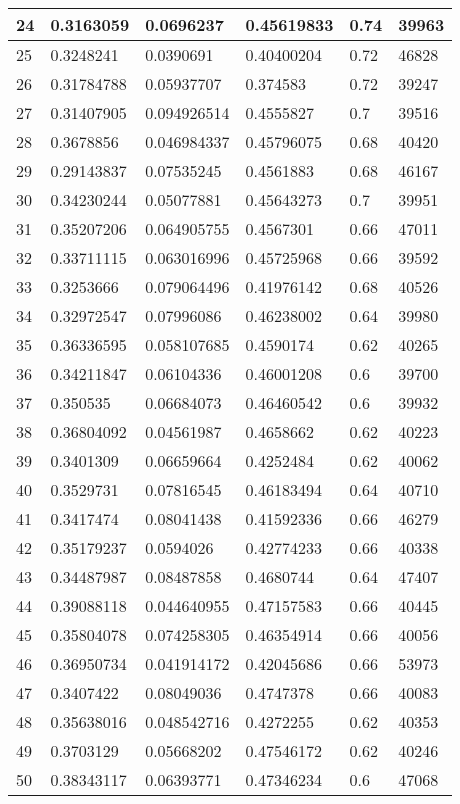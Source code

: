 \begin{longtable}{|l|l|l|l|l|l|}
24 & 0.3163059 & 0.0696237 & 0.45619833 & 0.74 & 39963 \\ \hline 
25 & 0.3248241 & 0.0390691 & 0.40400204 & 0.72 & 46828 \\ \hline 
26 & 0.31784788 & 0.05937707 & 0.374583 & 0.72 & 39247 \\ \hline 
27 & 0.31407905 & 0.094926514 & 0.4555827 & 0.7 & 39516 \\ \hline 
28 & 0.3678856 & 0.046984337 & 0.45796075 & 0.68 & 40420 \\ \hline 
29 & 0.29143837 & 0.07535245 & 0.4561883 & 0.68 & 46167 \\ \hline 
30 & 0.34230244 & 0.05077881 & 0.45643273 & 0.7 & 39951 \\ \hline 
31 & 0.35207206 & 0.064905755 & 0.4567301 & 0.66 & 47011 \\ \hline 
32 & 0.33711115 & 0.063016996 & 0.45725968 & 0.66 & 39592 \\ \hline 
33 & 0.3253666 & 0.079064496 & 0.41976142 & 0.68 & 40526 \\ \hline 
34 & 0.32972547 & 0.07996086 & 0.46238002 & 0.64 & 39980 \\ \hline 
35 & 0.36336595 & 0.058107685 & 0.4590174 & 0.62 & 40265 \\ \hline 
36 & 0.34211847 & 0.06104336 & 0.46001208 & 0.6 & 39700 \\ \hline 
37 & 0.350535 & 0.06684073 & 0.46460542 & 0.6 & 39932 \\ \hline 
38 & 0.36804092 & 0.04561987 & 0.4658662 & 0.62 & 40223 \\ \hline 
39 & 0.3401309 & 0.06659664 & 0.4252484 & 0.62 & 40062 \\ \hline 
40 & 0.3529731 & 0.07816545 & 0.46183494 & 0.64 & 40710 \\ \hline 
41 & 0.3417474 & 0.08041438 & 0.41592336 & 0.66 & 46279 \\ \hline 
42 & 0.35179237 & 0.0594026 & 0.42774233 & 0.66 & 40338 \\ \hline 
43 & 0.34487987 & 0.08487858 & 0.4680744 & 0.64 & 47407 \\ \hline 
44 & 0.39088118 & 0.044640955 & 0.47157583 & 0.66 & 40445 \\ \hline 
45 & 0.35804078 & 0.074258305 & 0.46354914 & 0.66 & 40056 \\ \hline 
46 & 0.36950734 & 0.041914172 & 0.42045686 & 0.66 & 53973 \\ \hline 
47 & 0.3407422 & 0.08049036 & 0.4747378 & 0.66 & 40083 \\ \hline 
48 & 0.35638016 & 0.048542716 & 0.4272255 & 0.62 & 40353 \\ \hline 
49 & 0.3703129 & 0.05668202 & 0.47546172 & 0.62 & 40246 \\ \hline 
50 & 0.38343117 & 0.06393771 & 0.47346234 & 0.6 & 47068 \\ \hline 
\end{longtable}